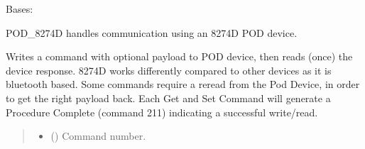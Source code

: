 \documentclass[letterpaper,10pt,english]{sphinxmanual}
\begin{document}
\begin{fulllineitems}
\label{\detokenize{Morelia.Devices:Morelia.Devices.PodDevice_8274D.Pod8274D}}
\pysigstartsignatures
{}
\pysigstopsignatures
\sphinxAtStartPar
Bases: {\hyperref[\detokenize{Morelia.Devices:Morelia.Devices.BasicPodProtocol.Pod}]{}}

\sphinxAtStartPar
POD\_8274D handles communication using an 8274D POD device.

\begin{fulllineitems}
\label{\detokenize{Morelia.Devices:Morelia.Devices.PodDevice_8274D.Pod8274D.WriteRead}}
\pysigstartsignatures
{}
\pysigstopsignatures
\sphinxAtStartPar
Writes a command with optional payload to POD device, then reads (once) the device response.
8274D works differently compared to other devices as it is bluetooth based. Some commands require a re\sphinxhyphen{}read from the
Pod Device, in order to get the right payload back. Each Get and Set Command will generate a Procedure Complete (command 211) indicating a successful write/read.
\begin{quote}\begin{description}
\begin{itemize}
\item {} 
\sphinxAtStartPar
{} (\sphinxstyleliteralemphasis{\sphinxupquote{ | }}) \textendash{} Command number.


\end{itemize}
\end{description}
\end{quote}
\end{fulllineitems}
\end{fulllineitems}
\end{document}
